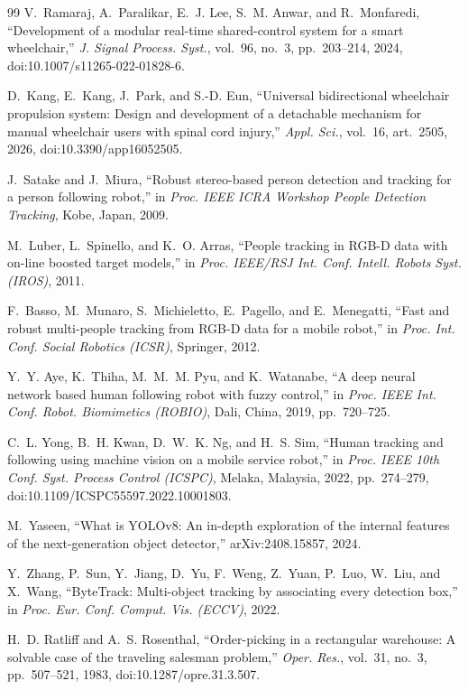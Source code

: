 \documentclass[conference]{IEEEtran}
\begin{document}
\begin{thebibliography}{99}
V.~Ramaraj, A.~Paralikar, E.~J. Lee, S.~M. Anwar, and R.~Monfaredi, ``Development of a modular real-time shared-control system for a smart wheelchair,'' \emph{J. Signal Process. Syst.}, vol.~96, no.~3, pp.~203--214, 2024, doi:10.1007/s11265-022-01828-6.

D.~Kang, E.~Kang, J.~Park, and S.-D. Eun, ``Universal bidirectional wheelchair propulsion system: Design and development of a detachable mechanism for manual wheelchair users with spinal cord injury,'' \emph{Appl. Sci.}, vol.~16, art.~2505, 2026, doi:10.3390/app16052505.

J.~Satake and J.~Miura, ``Robust stereo-based person detection and tracking for a person following robot,'' in \emph{Proc. IEEE ICRA Workshop People Detection Tracking}, Kobe, Japan, 2009.

M.~Luber, L.~Spinello, and K.~O. Arras, ``People tracking in RGB-D data with on-line boosted target models,'' in \emph{Proc. IEEE/RSJ Int. Conf. Intell. Robots Syst. (IROS)}, 2011.

F.~Basso, M.~Munaro, S.~Michieletto, E.~Pagello, and E.~Menegatti, ``Fast and robust multi-people tracking from RGB-D data for a mobile robot,'' in \emph{Proc. Int. Conf. Social Robotics (ICSR)}, Springer, 2012.

Y.~Y. Aye, K.~Thiha, M.~M.~M. Pyu, and K.~Watanabe, ``A deep neural network based human following robot with fuzzy control,'' in \emph{Proc. IEEE Int. Conf. Robot. Biomimetics (ROBIO)}, Dali, China, 2019, pp.~720--725.

C.~L. Yong, B.~H. Kwan, D.~W.~K. Ng, and H.~S. Sim, ``Human tracking and following using machine vision on a mobile service robot,'' in \emph{Proc. IEEE 10th Conf. Syst. Process Control (ICSPC)}, Melaka, Malaysia, 2022, pp.~274--279, doi:10.1109/ICSPC55597.2022.10001803.

M.~Yaseen, ``What is YOLOv8: An in-depth exploration of the internal features of the next-generation object detector,'' arXiv:2408.15857, 2024.

Y.~Zhang, P.~Sun, Y.~Jiang, D.~Yu, F.~Weng, Z.~Yuan, P.~Luo, W.~Liu, and X.~Wang, ``ByteTrack: Multi-object tracking by associating every detection box,'' in \emph{Proc. Eur. Conf. Comput. Vis. (ECCV)}, 2022.

H.~D. Ratliff and A.~S. Rosenthal, ``Order-picking in a rectangular warehouse: A solvable case of the traveling salesman problem,'' \emph{Oper. Res.}, vol.~31, no.~3, pp.~507--521, 1983, doi:10.1287/opre.31.3.507.


\end{thebibliography}
\end{document}
